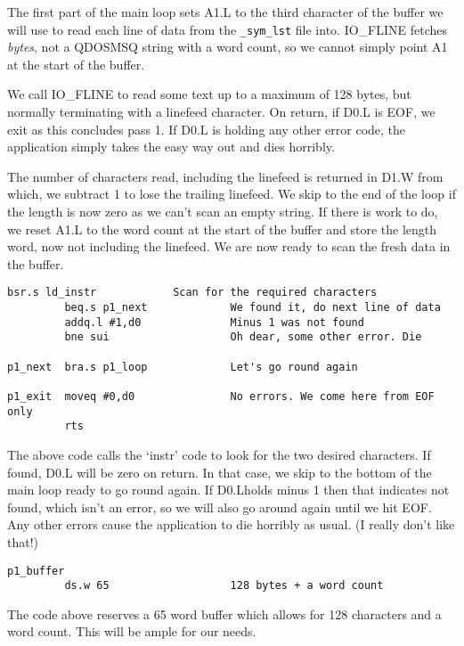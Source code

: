 The first part of the main loop sets A1.L to the third character of
    the buffer we will use to read each line of data from the
 \nolinkurl{_sym_lst} file into. IO\_FLINE fetches
 \emph{bytes}, not a QDOSMSQ string with a word count, so we
    cannot simply point A1 at the start of the buffer.

We call IO\_FLINE to read some text up to a maximum of 128 bytes, but
    normally terminating with a linefeed character. On return, if D0.L is EOF,
    we exit as this concludes pass 1. If D0.L is holding any other error code,
    the application simply takes the easy way out and dies horribly.

The number of characters read, including the linefeed is returned in
    D1.W from which, we subtract 1 to lose the trailing linefeed. We skip to
    the end of the loop if the length is now zero as we can't scan an empty
    string. If there is work to do, we reset A1.L to the word count at the
    start of the buffer and store the length word, now not including the
    linefeed. We are now ready to scan the fresh data in the buffer.

\begin{lstlisting}[firstnumber=1,]
         bsr.s ld_instr            Scan for the required characters
         beq.s p1_next             We found it, do next line of data
         addq.l #1,d0              Minus 1 was not found
         bne sui                   Oh dear, some other error. Die

p1_next  bra.s p1_loop             Let's go round again

p1_exit  moveq #0,d0               No errors. We come here from EOF only
         rts
\end{lstlisting}

The above code calls the `instr' code to look for the two desired
    characters. If found, D0.L will be zero on return. In that case, we skip
    to the bottom of the main loop ready to go round again. If D0.Lholds minus
    1 then that indicates not found, which isn't an error, so we will also go
    around again until we hit EOF. Any other errors cause the application to
    die horribly as usual. (I really don't like that!)

\begin{lstlisting}[firstnumber=1,]
p1_buffer
         ds.w 65                   128 bytes + a word count
\end{lstlisting}

The code above reserves a 65 word buffer which allows for 128
    characters and a word count. This will be ample for our needs.

